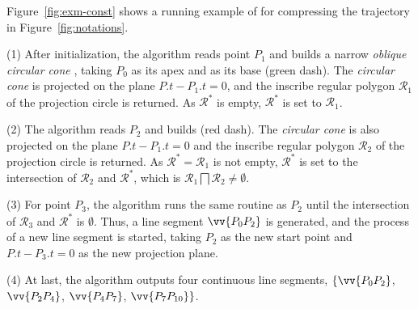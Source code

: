 \begin{example}
\label{exm-alg-conest}
Figure~\ref{fig:exm-const} shows a running example of \cist for compressing the trajectory  in Figure~\ref{fig:notations}.

\sstab (1) After initialization, the \cist algorithm reads point $P_1$ and builds a narrow \emph{oblique circular cone} , taking $P_0$ as its apex and  as its base (green dash). The \emph{circular cone} is projected on the plane $P.t-P_1.t=0$, and the inscribe regular polygon $\mathcal{R}_1$ of the projection circle is returned. As $\mathcal{R}^*$ is empty, $\mathcal{R}^*$ is set to $\mathcal{R}_1$.

\sstab(2) The algorithm reads $P_2$ and builds  (red dash). The \emph{circular cone} is also projected on the plane $P.t-P_1.t=0$ and the inscribe regular polygon $\mathcal{R}_2$ of the projection circle is returned. As $\mathcal{R}^*=\mathcal{R}_1$ is not empty, $\mathcal{R}^*$ is set to the intersection of $\mathcal{R}_2$ and $\mathcal{R}^*$, which is $\mathcal{R}_1 \bigsqcap \mathcal{R}_2 \ne \emptyset$.

\sstab (3) For point $P_3$, the algorithm runs the same routine as $P_2$ until the intersection of $\mathcal{R}_3$ and $\mathcal{R}^*$ is $\emptyset$. Thus, a line segment $\vv{P_0P_2}$ is generated, and the process of a new line segment is started, taking $P_2$ as the new start point and $P.t-P_3.t=0$ as the new projection plane.

\sstab (4) At last, the algorithm outputs four continuous line segments, \ie $\{\vv{P_0P_2}$, $\vv{P_2P_4}$, $\vv{P_4P_{7}}$, $\vv{P_7P_{10}}\}$. \eop
\end{example}






